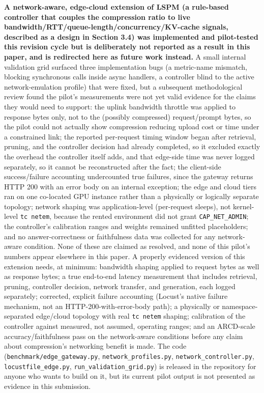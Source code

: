 \textbf{A network-aware, edge-cloud extension of LSPM (a rule-based controller that couples the compression ratio to live bandwidth/RTT/queue-length/concurrency/KV-cache signals, described as a design in Section 3.4) was implemented and pilot-tested this revision cycle but is deliberately not reported as a result in this paper, and is redirected here as future work instead.} A small internal validation grid surfaced three implementation bugs (a metric-name mismatch, blocking synchronous calls inside async handlers, a controller blind to the active network-emulation profile) that were fixed, but a subsequent methodological review found the pilot's measurements were not yet valid evidence for the claims they would need to support: the uplink bandwidth throttle was applied to response bytes only, not to the (possibly compressed) request/prompt bytes, so the pilot could not actually show compression reducing upload cost or time under a constrained link; the reported per-request timing window began after retrieval, pruning, and the controller decision had already completed, so it excluded exactly the overhead the controller itself adds, and that edge-side time was never logged separately, so it cannot be reconstructed after the fact; the client-side success/failure accounting undercounted true failures, since the gateway returns HTTP 200 with an error body on an internal exception; the edge and cloud tiers ran on one co-located GPU instance rather than a physically or logically separate topology; network shaping was application-level (per-request sleeps), not kernel-level \texttt{tc netem}, because the rented environment did not grant \texttt{CAP\_NET\_ADMIN}; the controller's calibration ranges and weights remained unfitted placeholders; and no answer-correctness or faithfulness data was collected for any network-aware condition. None of these are claimed as resolved, and none of this pilot's numbers appear elsewhere in this paper. A properly evidenced version of this extension needs, at minimum: bandwidth shaping applied to request bytes as well as response bytes; a true end-to-end latency measurement that includes retrieval, pruning, controller decision, network transfer, and generation, each logged separately; corrected, explicit failure accounting (Locust's native failure mechanism, not an HTTP-200-with-error-body path); a physically or namespace-separated edge/cloud topology with real \texttt{tc netem} shaping; calibration of the controller against measured, not assumed, operating ranges; and an ARCD-scale accuracy/faithfulness pass on the network-aware conditions before any claim about compression's networking benefit is made. The code (\texttt{benchmark/edge\_gateway.py}, \texttt{network\_profiles.py}, \texttt{network\_controller.py}, \texttt{locustfile\_edge.py}, \texttt{run\_validation\_grid.py}) is released in the repository for anyone who wants to build on it, but its current pilot output is not presented as evidence in this submission.

